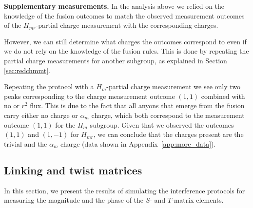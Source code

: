 \documentclass[a4paper,twocolumn,11pt]{quantumarticle}
\begin{document}
\textbf{Supplementary measurements.} In the analysis above we relied on the knowledge of the fusion outcomes to match the observed measurement outcomes of the $H_{mr}$-partial charge measurement with the corresponding charges. 

However, we can still determine what charges the outcomes correspond to even if we do not rely on the knowledge of the fusion rules. This is done by repeating the partial charge measurements for another subgroup, as explained in Section \ref{sec:redchmmt}.

Repeating the protocol with a $H_m$-partial charge measurement we see only two peaks corresponding to the charge measurement outcome $(1,1)$ combined with no or $r^2$ flux. This is due to the fact that all anyons that emerge from the fusion carry either no charge or $\alpha_m$ charge, which both correspond to the measurement outcome $(1,1)$ for the $H_m$ subgroup. Given that we observed the outcomes $(1,1)$ and $(1,-1)$ for $H_{mr}$, we can conclude that the charges present are the trivial and the $\alpha_m$ charge (data shown in Appendix~\ref{app:more_data}).




\subsection{Linking and twist matrices}\label{sec:num:intef}

In this section, we present the results of simulating the interference protocols for measuring the magnitude and the phase of the $S$- and $T$-matrix elements. 
\end{document}
